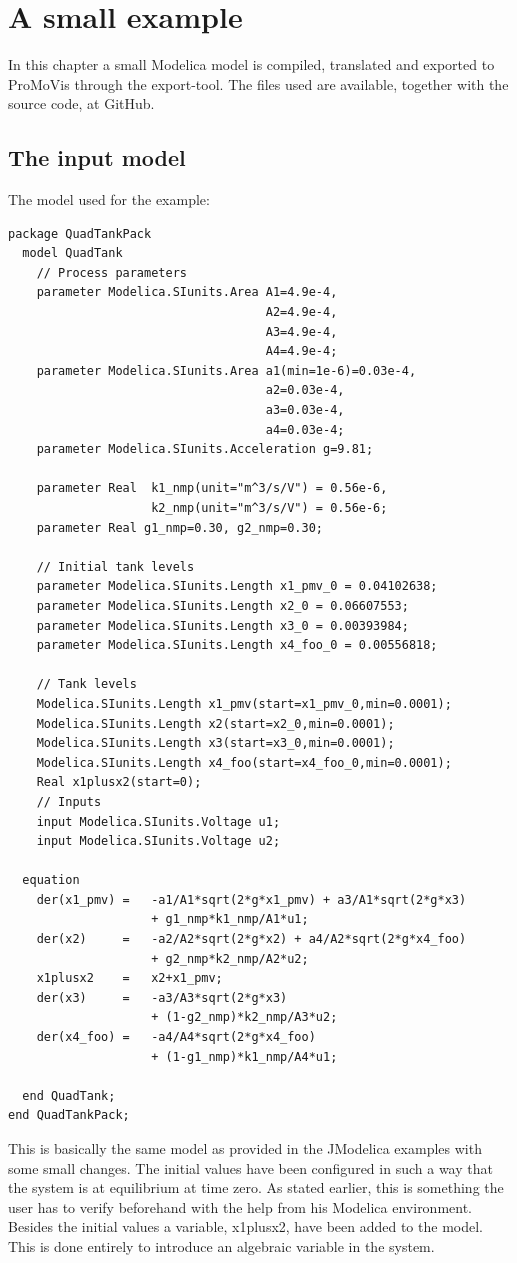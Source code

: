\section{A small example}
In this chapter a small Modelica model is compiled, translated and exported to ProMoVis through the export-tool. The files used are available, together with the source code, at GitHub\cite{githabb}\nocite{*}.

\subsection{The input model}

The model used for the example:
\lstset{language=modelica}
\begin{lstlisting}
package QuadTankPack
  model QuadTank
    // Process parameters
	parameter Modelica.SIunits.Area A1=4.9e-4, 
									A2=4.9e-4, 
									A3=4.9e-4, 
									A4=4.9e-4;
	parameter Modelica.SIunits.Area a1(min=1e-6)=0.03e-4, 
									a2=0.03e-4, 
									a3=0.03e-4, 
									a4=0.03e-4;
	parameter Modelica.SIunits.Acceleration g=9.81;
	
	parameter Real 	k1_nmp(unit="m^3/s/V") = 0.56e-6, 
					k2_nmp(unit="m^3/s/V") = 0.56e-6;
	parameter Real g1_nmp=0.30, g2_nmp=0.30;

    // Initial tank levels
	parameter Modelica.SIunits.Length x1_pmv_0 = 0.04102638;
	parameter Modelica.SIunits.Length x2_0 = 0.06607553;
	parameter Modelica.SIunits.Length x3_0 = 0.00393984;
	parameter Modelica.SIunits.Length x4_foo_0 = 0.00556818;
	
    // Tank levels
	Modelica.SIunits.Length x1_pmv(start=x1_pmv_0,min=0.0001);
	Modelica.SIunits.Length x2(start=x2_0,min=0.0001);
	Modelica.SIunits.Length x3(start=x3_0,min=0.0001);
	Modelica.SIunits.Length x4_foo(start=x4_foo_0,min=0.0001);
	Real x1plusx2(start=0);
	// Inputs
	input Modelica.SIunits.Voltage u1;
	input Modelica.SIunits.Voltage u2;

  equation    
    der(x1_pmv) = 	-a1/A1*sqrt(2*g*x1_pmv) + a3/A1*sqrt(2*g*x3) 
					+ g1_nmp*k1_nmp/A1*u1;						
	der(x2) 	= 	-a2/A2*sqrt(2*g*x2) + a4/A2*sqrt(2*g*x4_foo)
					+ g2_nmp*k2_nmp/A2*u2;
	x1plusx2	=	x2+x1_pmv;
	der(x3) 	= 	-a3/A3*sqrt(2*g*x3) 
					+ (1-g2_nmp)*k2_nmp/A3*u2;
	der(x4_foo) = 	-a4/A4*sqrt(2*g*x4_foo) 
					+ (1-g1_nmp)*k1_nmp/A4*u1;

  end QuadTank;
end QuadTankPack;
\end{lstlisting}
This is basically the same model as provided in the JModelica examples with some small changes. The initial values have been configured in such a way that the system is at equilibrium at time zero. As stated earlier, this is something the user has to verify beforehand with the help from his Modelica environment. Besides the initial values a variable, x1plusx2, have been added to the model. This is done entirely to introduce an algebraic variable in the system.
